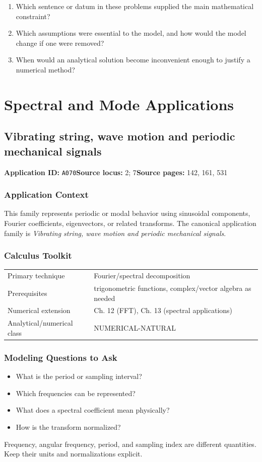 \documentclass[11pt]{book}
\newcommand{\pid}[1]{\texttt{#1}}
\begin{document}
\begin{reflectionbox}\begin{enumerate}
\item Which sentence or datum in these problems supplied the main mathematical constraint?
\item Which assumptions were essential to the model, and how would the model change if one were removed?
\item When would an analytical solution become inconvenient enough to justify a numerical method?
\end{enumerate}\end{reflectionbox}
\part{Spectral and Mode Applications}
\chapter{Vibrating string, wave motion and periodic mechanical signals}\label{app:A070}
\textbf{Application ID:} \pid{A070}\quad \textbf{Source locus:} 2; 7\quad \textbf{Source pages:} 142, 161, 531
\section*{Application Context}
This family represents periodic or modal behavior using sinusoidal components, Fourier coefficients, eigenvectors, or related transforms. The canonical application family is \emph{Vibrating string, wave motion and periodic mechanical signals}.
\section*{Calculus Toolkit}
\begin{tabularx}{\textwidth}{@{}lX@{}}\toprule
Primary technique & Fourier/spectral decomposition \\
Prerequisites & trigonometric functions, complex/vector algebra as needed \\
Numerical extension & Ch. 12 (FFT), Ch. 13 (spectral applications) \\
Analytical/numerical class & NUMERICAL-NATURAL \\
\bottomrule\end{tabularx}
\section*{Modeling Questions to Ask}\begin{itemize}
\item What is the period or sampling interval?
\item Which frequencies can be represented?
\item What does a spectral coefficient mean physically?
\item How is the transform normalized?
\end{itemize}
\begin{errorbox}Frequency, angular frequency, period, and sampling index are different quantities. Keep their units and normalizations explicit.\end{errorbox}
\end{document}
